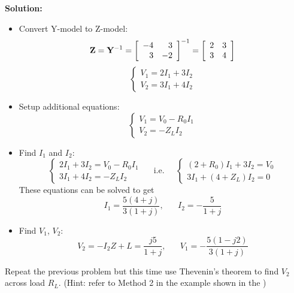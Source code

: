 
  {\bf Solution:} 
  \begin{itemize}
  \item Convert Y-model to Z-model:
    \[ {\bf Z}={\bf Y}^{-1}=\left[ \begin{array}{rr}-4 & 3 \\ 3 & -2\end{array} \right]^{-1}
    =\left[ \begin{array}{rr}2 & 3 \\ 3 & 4\end{array} \right] \]
    \[ \left\{ \begin{array}{l} V_1=2I_1+3I_2 \\ V_2=3I_1+4I_2 \end{array} \right. \]
  \item Setup additional equations:
    \[ \left\{ \begin{array}{l} V_1=V_0-R_0I_1 \\ V_2=-Z_L I_2 \end{array} \right. \]
  \item Find $I_1$ and $I_2$:
    \[ \left\{ \begin{array}{l} 2I_1+3I_2=V_0-R_0I_1\\ 3I_1+4I_2=-Z_LI_2\end{array}\right. 
      \;\;\;\;\;\mbox{i.e.}\;\;\;\;\;
    \left\{ \begin{array}{l} (2+R_0)I_1+3I_2=V_0\\ 3I_1+(4+Z_L)I_2=0\end{array}\right. \]
      These equations can be solved to get
      \[ I_1=\frac{5(4+j)}{3(1+j)},\;\;\;\;\;\;I_2=-\frac{5}{1+j}\]
  \item Find $V_1$, $V_2$:
    \[ V_2=-I_2Z+L=\frac{j5}{1+j},\;\;\;\;\;\; V_1=-\frac{5(1-j2)}{3(1+j)} \]
  \end{itemize}

\item Repeat the previous problem but this time use Thevenin's theorem to find
$V_2$ across load $R_L$. (Hint: refer to Method 2 in the example shown in the
)


